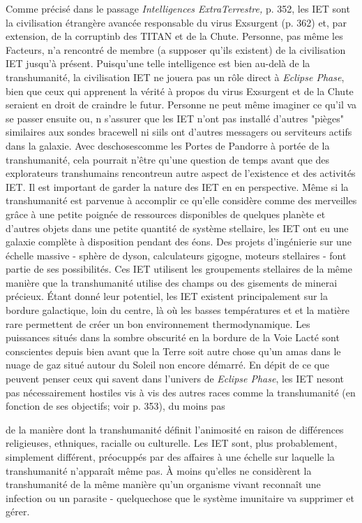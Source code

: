 Comme précisé dans le passage \textit{Intelligences ExtraTerrestre,} p. 352, les IET sont la civilisation étrangère avancée responsable du virus Exsurgent (p. 362) et, par extension, de la corruptinb des TITAN et de la Chute. Personne, pas même les Facteurs, n'a rencontré de membre (a supposer qu'ils existent) de la civilisation IET jusqu'à présent. Puisqu'une telle intelligence est bien au-delà de la transhumanité, la civilisation IET ne jouera pas un rôle direct à \textit{ Eclipse Phase}, bien que ceux qui apprenent la vérité à propos du virus Exsurgent et de la Chute seraient en droit de craindre le futur. Personne ne peut même imaginer ce qu'il va se passer ensuite ou, n s'assurer que les IET n'ont pas installé d'autres "pièges" similaires aux sondes bracewell ni siils ont d'autres messagers ou serviteurs actifs dans la galaxie. Avec deschosescomme les Portes de Pandorre à portée de la transhumanité, cela pourrait n'être qu'une question de temps avant que des explorateurs transhumains rencontreun autre aspect de l'existence et des activités IET. Il est important de garder la nature des IET en en perspective. Même si la transhumanité est parvenue à accomplir ce qu'elle considère comme des merveilles grâce à une petite poignée de ressources disponibles de quelques planète et d'autres objets dans une petite quantité de système stellaire, les IET ont eu une galaxie complète à disposition pendant des éons. Des projets d'ingénierie sur une échelle massive - sphère de dyson, calculateurs gigogne, moteurs stellaires - font partie de ses possibilités. Ces IET utilisent les groupements stellaires de la même manière que la transhumanité utilise des champs ou des gisements de minerai précieux. Étant donné leur potentiel, les IET existent principalement sur la bordure galactique, loin du centre, là où les basses températures et et la matière rare permettent de créer un bon environnement thermodynamique. Les puissances situés dans la sombre obscurité en la bordure de la Voie Lacté sont conscientes depuis bien avant que la Terre soit autre chose qu'un amas dans le nuage de gaz situé autour du Soleil non encore démarré. En dépit de ce que peuvent penser ceux qui savent dans l'univers de \textit{Eclipse Phase}, les IET nesont pas nécessairement hostiles vis à vis des autres races comme la transhumanité (en fonction de ses objectifs; voir p. 353), du moins pas 

de la manière dont la transhumanité définit l'animosité en raison de différences religieuses, ethniques, racialle ou culturelle. Les IET sont, plus probablement, simplement différent, préocuppés par des affaires à une échelle sur laquelle la transhumanité n'apparaît même pas. À moins qu'elles ne considèrent la transhumanité de la même manière qu'un organisme vivant reconnaît une infection ou un parasite - quelquechose que le système imunitaire va supprimer et gérer. 

